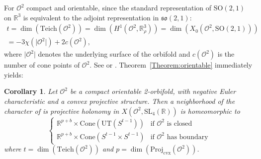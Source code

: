 \documentclass[a4paper,11pt]{article}
\newtheorem{Corollary}[Theorem]{Corollary}
\begin{document}
For $\mathcal O^2$ compact and orientable, since the standard representation of $\mathrm{SO}(2,1)$ 
on $\mathbb R^3$
is equivalent to the adjoint
representation in $\mathfrak{so}(2,1)$:
\begin{multline}
 \label{eqn:DimTeich}
t=\dim( \mathrm{Teich}(\mathcal O^2))=  
\dim (H^1(\mathcal O^2,\mathbb R^3_\rho))=\dim (X_0(\mathcal O^2, \textrm{SO}(2,1)) ) \\ = -3\chi(\vert \mathcal O^2\vert ) + 2 c(\mathcal O^2), 
\end{multline}
% 
where $\vert \mathcal O^2\vert $ denotes the underlying surface of the orbifold and $c(\mathcal O^2)$ is the number of cone points of 
 $\mathcal O^2$. See  \cite{Weil} or  \cite{PortiDim}.
Theorem~\ref{Theorem:orientable} immediately yields:


\begin{Corollary}
 Let $\mathcal O^2$ be a compact orientable 2-orbifold,
 with negative Euler characteristic and a convex projective structure. Then 
 a neighborhood of the character of is projective holonomy  in
 $ X(\mathcal O^2, \mathrm{SL}_4(\mathbb R))$ is
 homeomorphic to 
 $$
 \begin{cases}
        \mathbb R^{p+b}\times  \mathrm{Cone}( \mathrm{UT}( S^{t-1})) & \textrm{if }\mathcal O^2 \textrm{ is closed}\\
         \mathbb R^{p+b}\times 
         \mathrm{Cone}( S^{t-1}\times S^{t-1}) & \textrm{if }\mathcal O^2 \textrm{ has boundary}
        \end{cases}
 $$ where 
 $t=\dim ( \mathrm{Teich}(\mathcal O^2) )$ and $p=\dim ( \mathrm{Proj}_{\mathrm{cvx}}(\mathcal O^2))$.
\end{Corollary}
\end{document}
